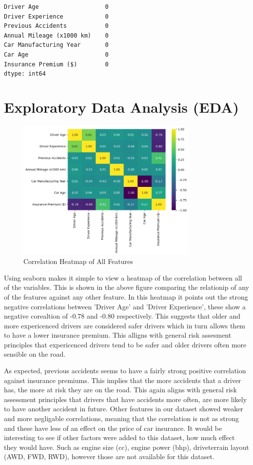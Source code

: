 \documentclass{article}
\begin{document}
\begin{verbatim}
Driver Age                   0
Driver Experience            0
Previous Accidents           0
Annual Mileage (x1000 km)    0
Car Manufacturing Year       0
Car Age                      0
Insurance Premium ($)        0
dtype: int64
\end{verbatim}





\newpage
\section{Exploratory Data Analysis (EDA)}

\begin{figure}[h]
\centering
\includegraphics[width=0.8\textwidth]{heatmap.png}
\caption{Correlation Heatmap of All Features}\label{fig:heatmap}
\end{figure}

Using seaborn makes it simple to view a heatmap of the correlation between all of the variables. This is shown in the above figure comparing the relationip of any of the features against any other feature. In this heatmap it points out the strong negative correlations between 'Driver Age' and 'Driver Experience', these show a negative corealtion of -0.78 and -0.80 respectively. This suggests that older and more expericenced drivers are considered safer drivers which in turn allows them to have a lower insurance premium. This alligns with general risk assesment principles that expericenced drivers tend to be safer and older drivers often more sensible on the road. 

As expected, previous accidents seems to have a fairly strong positive correlation against insurance premiums. This implies that the more accidents that a driver has, the more at risk they are on the road. This again aligns with general risk assessment principles that drivers that have accidents more often, are more likely to have another accident in future. Other features in our dataset showed weaker and more negligable correlations, meaning that the correlation is not as strong and these have less of an effect on the price of car insurance. It would be interesting to see if other factors were added to this dataset, how much effect they would have. Such as engine size (cc), engine power (bhp), driveterrain layout (AWD, FWD, RWD), however those are not available for this dataset.
\end{document}
